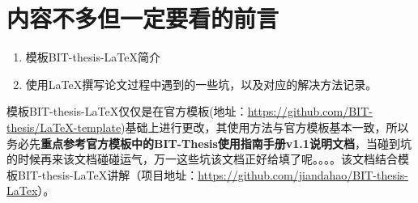 \chapter{内容不多但一定要看的前言}
\begin{enumerate}
\item 模板BIT-thesis-LaTeX简介
\item 使用LaTeX撰写论文过程中遇到的一些坑，以及对应的解决方法记录。
\end{enumerate}
模板BIT-thesis-LaTeX仅仅是在官方模板(地址：\url{https://github.com/BIT-thesis/LaTeX-template})基础上进行更改，其使用方法与官方模板基本一致，所以务必先\textbf{重点参考官方模板中的BIT-Thesis使用指南手册v1.1说明文档}，当碰到坑的时候再来该文档碰碰运气，万一这些坑该文档正好给填了呢。。。。该文档结合模板BIT-thesis-LaTeX讲解（项目地址：\url{https://github.com/jiandahao/BIT-thesis-LaTex}）。
\\
\\
\begin{center}
{{}}
\end{center}